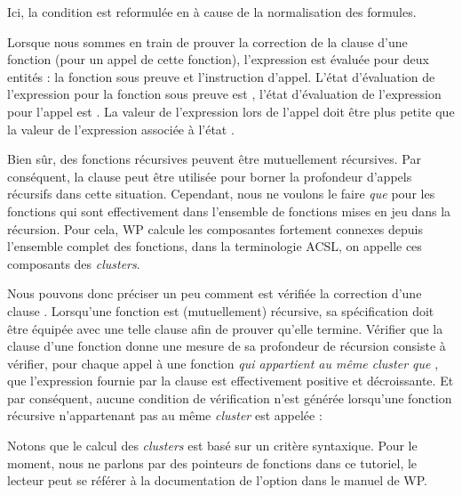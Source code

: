

Ici, la condition  est reformulée en
 à cause de la normalisation des formules.


Lorsque nous sommes en train de prouver la correction de la clause
 d'une fonction (pour un appel de cette fonction),
l'expression est évaluée pour deux entités : la fonction sous preuve et
l'instruction d'appel. L'état d'évaluation de l'expression pour la fonction
sous preuve est , l'état d'évaluation de l'expression pour
l'appel est . La valeur de l'expression lors de l'appel doit
être plus petite que la valeur de l'expression associée à l'état .




Bien sûr, des fonctions récursives peuvent être mutuellement récursives. Par
conséquent, la clause  peut être utilisée pour borner la
profondeur d'appels récursifs dans cette situation. Cependant, nous ne voulons
le faire \emph{que} pour les fonctions qui sont effectivement dans l'ensemble de
fonctions mises en jeu dans la récursion. Pour cela, WP calcule les composantes
fortement connexes depuis l'ensemble complet des fonctions, dans la terminologie
ACSL, on appelle ces composants des \emph{clusters}.


Nous pouvons donc préciser un peu comment est vérifiée la correction d'une clause
. Lorsqu'une fonction est (mutuellement) récursive, sa
spécification doit être équipée avec une telle clause afin de prouver qu'elle
termine. Vérifier que la clause  d'une fonction
 donne une mesure de sa profondeur de récursion consiste à vérifier,
pour chaque appel à une fonction \emph{qui appartient au même cluster que
}, que l'expression fournie par la clause est effectivement positive
et décroissante. Et par conséquent, aucune condition de vérification n'est
générée lorsqu'une fonction récursive n'appartenant pas au même \emph{cluster}
est appelée :




\begin{Information}
  Notons que le calcul des \emph{clusters} est basé sur un critère syntaxique.
  Pour le moment, nous ne parlons par des pointeurs de fonctions dans ce tutoriel,
  le lecteur peut se référer à la documentation de l'option
   dans le manuel de WP.
\end{Information}


